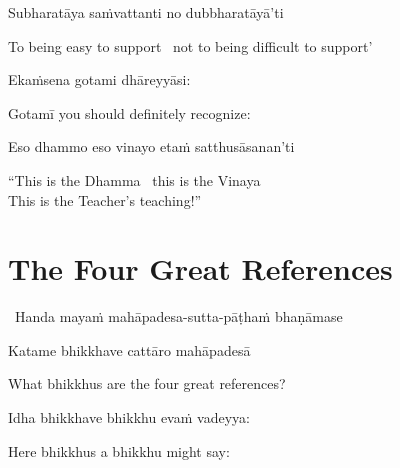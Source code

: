 Subharatāya saṁvattanti no dubbharatāyā'ti

\begin{english}
  To being easy to support \breathmark\ not to being difficult to support'
\end{english}

Ekaṁsena gotami dhāreyyāsi:

\begin{english}
  Gotamī\makeatletter\hyperlink{endnote85-appendix}\makeatother
  you should definitely recognize:
\end{english}

Eso dhammo eso vinayo etaṁ satthusāsanan'ti

\begin{english}
  ``This is the Dhamma \breathmark\ this is the Vinaya\\
  This is the Teacher's teaching!''
\end{english}

\suttaRef{[AN 8.53]}


\section{The Four Great References}
\label{four-great-references}

\begin{leader}
  \anglebracketleft\ \hspace{-0.5mm}Handa mayaṁ mahāpadesa-sutta-pāṭhaṁ bhaṇāmase \hspace{-0.5mm}\anglebracketright\
\end{leader}

Katame bhikkhave cattāro mahāpadesā

\begin{english}
  What bhikkhus are the four great references?
\end{english}

Idha bhikkhave bhikkhu evaṁ vadeyya:

\begin{english}
  Here bhikkhus a bhikkhu might say:
\end{english}

